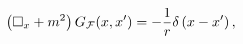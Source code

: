 \begin{equation}
\left(\Box_{x}+m^{2}\right)G_{{\cal F}}(x,x')=
-\frac{1}{r}\delta\left(x-x'\right),
\label{fe0}
\end{equation}

